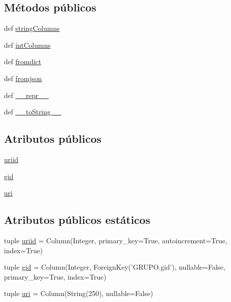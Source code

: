 \subsection*{Métodos públicos}
\begin{DoxyCompactItemize}
\item 
def \hyperlink{classdb__layer_1_1_u_r_i_s_abd12457dcfb2a81a6b788e10f30ca8a9}{string\-Columns}
\item 
def \hyperlink{classdb__layer_1_1_u_r_i_s_ae3a356f32006d48e4785f627ba7debb0}{int\-Columns}
\item 
def \hyperlink{classdb__layer_1_1_u_r_i_s_a6f10547450f029464c78dcf18ade87cc}{fromdict}
\item 
def \hyperlink{classdb__layer_1_1_u_r_i_s_a1742d3502f4701bb2ebeb4b0ccbfcf6c}{fromjson}
\item 
def \hyperlink{classdb__layer_1_1_u_r_i_s_a89b84b0303d692308a6c2eac9a17a5a9}{\-\_\-\-\_\-repr\-\_\-\-\_\-}
\item 
def \hyperlink{classdb__layer_1_1_u_r_i_s_ae1fb1b6feeed82040621396a68ab9fc6}{\-\_\-\-\_\-to\-String\-\_\-\-\_\-}
\end{DoxyCompactItemize}
\subsection*{Atributos públicos}
\begin{DoxyCompactItemize}
\item 
\hyperlink{classdb__layer_1_1_u_r_i_s_a28e0597e0d662150c83be1617ed84fb1}{uriid}
\item 
\hyperlink{classdb__layer_1_1_u_r_i_s_a264e2e0758357d18359f92380e8249dc}{gid}
\item 
\hyperlink{classdb__layer_1_1_u_r_i_s_a96adfe69ce986533f348b9534bd56ba1}{uri}
\end{DoxyCompactItemize}
\subsection*{Atributos públicos estáticos}
\begin{DoxyCompactItemize}
\item 
tuple \hyperlink{classdb__layer_1_1_u_r_i_s_a6120a757a93cee58b3edbd0a21c53ea1}{uriid} = Column(Integer, primary\-\_\-key=True, autoincrement=True, index=True)
\item 
tuple \hyperlink{classdb__layer_1_1_u_r_i_s_a1d76417de9c74a2a88a926ba6cd972ba}{gid} = Column(Integer, Foreign\-Key('G\-R\-U\-P\-O.\-gid'), nullable=False, primary\-\_\-key=True, index=True)
\item 
tuple \hyperlink{classdb__layer_1_1_u_r_i_s_adb880c6700b90a1413c072e1897fb5ba}{uri} = Column(String(250), nullable=False)
\end{DoxyCompactItemize}


